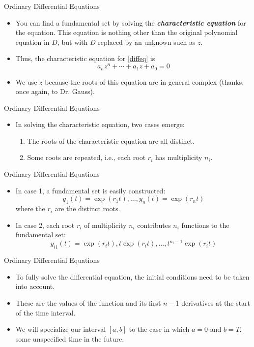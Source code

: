 \begin{frame}
Ordinary Differential Equations
 \begin{itemize}
 \item You can find a fundamental set by solving the
 \textit{\textbf{characteristic equation}} for the equation.  This equation is
 nothing other than the original polynomial equation in $D$, but
 with $D$ replaced by an unknown such as $z$.
 \item Thus, the characteristic equation for \eqref{diffeq} is
 \[a_nz^n+\cdots + a_1z + a_0=0\]
 \item We use $z$ because the roots of this equation are in
 general complex (thanks, once again, to Dr. Gauss).
\end{itemize}
\end{frame}
\begin{frame}
Ordinary Differential Equations
 \begin{itemize}
 \item In solving the characteristic equation, two cases emerge:
 \begin{enumerate}
 \item The roots of the characteristic equation are all distinct.
 \item Some roots are repeated, i.e., each root $r_i$ has
 multiplicity $n_i$.
 \end{enumerate}
\end{itemize}
\end{frame}
\begin{frame}
Ordinary Differential Equations
 \begin{itemize}
 \item In case 1, a fundamental set is easily constructed:
 \[y_1(t)=\exp(r_1t),\ldots,y_n(t)=\exp(r_nt) \]
 where the $r_i$ are the distinct roots.
 \item In case 2, each root $r_i$ of multiplicity $n_i$ contributes
 $n_i$ functions to the fundamental set:
 \[y_{i1}(t)=\exp(r_it),t\exp(r_it),\ldots,t^{n_i-1}\exp(r_it) \]
\end{itemize}
\end{frame}
\begin{frame}
Ordinary Differential Equations
 \begin{itemize}
 \item To fully solve the differential equation, the initial
 conditions need to be taken into account.
 \item These are the values of the function and its first $n-1$
 derivatives at the start of the time interval.
 \item We will specialize our interval $[a,b]$ to the case in which $a=0$
 and $b=T$, some unspecified time in the future.
\end{itemize}
\end{frame}
